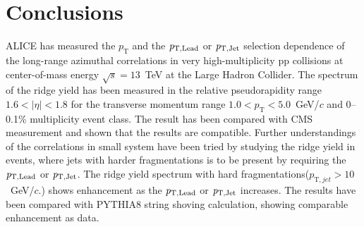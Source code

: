 
\section{Conclusions}
\label{sec:summary}


ALICE has measured the $p_{\mathrm T}$ and the $\it{p}_{\rm{T,Lead}}$ or $\it{p}_{\rm{T,Jet}}$ selection dependence of the long-range azimuthal correlations in very high-multiplicity pp collisions at center-of-mass energy $\sqrt{s} = 13$~TeV at the Large Hadron Collider. The spectrum of the ridge yield has been measured in the relative pseudorapidity range $1.6 < |\eta| < 1.8$ for the transverse momentum range $1.0 < p_{\mathrm T} < 5.0$~GeV/$c$ and 0--0.1\% multiplicity event class. The result has been compared with CMS measurement and shown that the results are compatible. Further understandings of the correlations in small system have been tried by studying the ridge yield in events, where jets with harder fragmentations is to be present by requiring the $\it{p}_{\rm{T,Lead}}$ or $\it{p}_{\rm{T,Jet}}$. The ridge yield spectrum with hard fragmentations($p_{\mathrm T, jet} > 10$~GeV/$c$.) shows enhancement as the $\it{p}_{\rm{T,Lead}}$ or $\it{p}_{\rm{T,Jet}}$ increases. The results have been compared with PYTHIA8 string shoving calculation, showing comparable enhancement as data.


